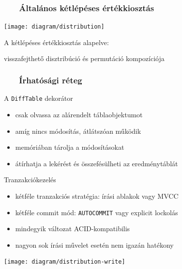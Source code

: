 \documentclass[
    aspectratio=169,
]{beamer}
\newcommand{\slidetitle}[2]{\frametitle{{\small #1 ~ \ding{226} ~ } \normalsize \textbf{#2} }}
\begin{document}
\begin{frame}[t,fragile]
\begin{minipage}[t]{0.65\textwidth}
    \end{minipage}
    
\end{frame}

\begin{frame}
    \slidetitle{\sectionshorttitle}{Általános kétlépéses értékkiosztás}
    
    \centering
    
    \texttt{[image: diagram/distribution]}
    
    A kétlépéses értékkiosztás alapelve: \par
    visszafejthető disztribúció és permutáció kompozíciója
\end{frame}

\begin{frame}
    \slidetitle{\sectionshorttitle}{Írhatósági réteg}
    
    \begin{minipage}[c]{0.65\textwidth}
        {\color{beamer@blendedblue}A \texttt{DiffTable} dekorátor}
        
        \begin{itemize}
            \item csak olvassa az alárendelt táblaobjektumot
            \item amíg nincs módosítás, átlátszóan működik
            \item memóriában tárolja a módosításokat
            \item átírhatja a lekérést és összefésülheti az eredménytáblát
        \end{itemize}
        
        \vspace{0.4cm}
        
        {\color{beamer@blendedblue}Tranzakciókezelés}
        
        \begin{itemize}
            \item kétféle tranzakciós stratégia: írási ablakok vagy MVCC
            \item kétféle commit mód: \texttt{AUTOCOMMIT} vagy explicit lockolás
            \item mindegyik változat ACID-kompatibilis
            \item nagyon sok írási művelet esetén nem igazán hatékony
        \end{itemize}
    \end{minipage}%
    \hspace*{\fill}%
    \begin{minipage}[c]{0.32\textwidth}
        \centering
        
        \texttt{[image: diagram/distribution-write]}
    \end{minipage}%
    \hspace*{\fill}%
\end{frame}
\end{document}
